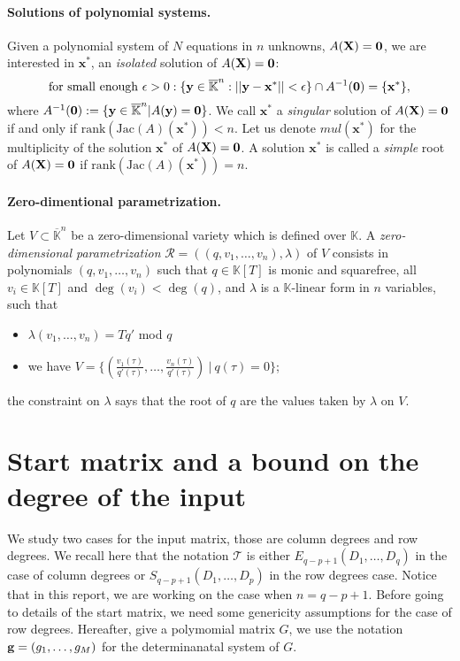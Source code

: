\documentclass[11pt]{article}
\numberwithin{Property}{section}
\numberwithin{Theorem}{section}
\numberwithin{Proposition}{section}
\numberwithin{Lemma}{section}
\numberwithin{Corollary}{section}
\numberwithin{Definition}{section}
\numberwithin{Remark}{section}
\numberwithin{Conjecture}{section}
\numberwithin{Problem}{section}
\numberwithin{Claim}{section}
\theoremstyle{definition}
\numberwithin{Example}{section}
\def\bar{\overline}
\newcommand{\field}{\mathbb{K}} %
\newcommand{\mat}[1]{\mathbf{\MakeUppercase{#1}}} %
\begin{document}
\paragraph{Solutions of polynomial systems.} Given a polynomial system of $N$ equations in $n$ unknowns, $A(\mat{X}) = \mat{0}$, we are interested in $\mathbf{x}^*$, an \emph{isolated} solution of $A(\mat{X}) = \mat{0}$:
\[
\mathrm{for \ small \ enough} \ \epsilon > 0 : \{\mathbf{y} \in \bar{\field}^n : ||\mathbf{y} - \mathbf{x}^*|| < \epsilon\} \cap A^{-1}(\mat{0}) = \{\mathbf{x}^*\}, 
\] where $A^{-1}(\mat{0}) := \{\mathbf{y} \in \bar{\field}^n | A(\mathbf{y}) = \mat{0}\}$. We call $\mathbf{x}^*$ a \emph{singular} solution of $A(\mat{X}) = \mat{0}$ if and only if $\mathrm{rank}(\mathrm{Jac}(A)(\mathbf{x}^*)) < n$.  Let us denote $mul(\mathbf{x}^*)$ for the multiplicity of the solution $\mathbf{x}^*$ of $A(\mat{X}) = \mat{0}$.   A solution $\mathbf{x}^*$ is called a \emph{simple} root of $A(\mat{X}) = \mat{0}$ if  $\mathrm{rank}(\mathrm{Jac}(A)(\mathbf{x}^*)) = n$.
\paragraph{Zero-dimentional parametrization.} Let $V \subset \bar{\field}^n$ be a zero-dimensional variety which is defined over $\field$. A \emph{zero-dimensional parametrization} $\mathscr{R} = ((q,v_1, \ldots, v_n), \lambda)$ of $V$ consists in polynomials $(q,v_1, \ldots, v_n)$ such that $q \in \field[T]$ is monic and squarefree, all $v_i \in \field[T]$ and $\deg(v_i) < \deg(q)$, and $\lambda$ is a $\field$-linear form in $n$ variables, such that 
\begin{itemize}
\item $\lambda(v_1, \ldots, v_n) = Tq'$ mod $q$
\item we have $V = \{(\frac{v_1(\tau)}{q'(\tau)}, \ldots, \frac{v_n(\tau)}{q'(\tau)}) \ | \ q(\tau) = 0\}$;
\end{itemize}
the constraint on $\lambda$ says that the root of $q$ are the values taken by $\lambda$ on $V$. 

\section{Start matrix and a bound on the degree of the input}
We study two cases for the input matrix, those are column degrees and row degrees. We recall here that the notation $\mathcal{T}$ is either $E_{q-p+1}(D_1, \ldots, D_q)$ in the case of column degrees or $S_{q-p+1}(D_1, \ldots, D_p)$ in the row degrees case. Notice that in this report, we are working on the case when $n = q-p+1$. Before going to details of the start matrix, we need some genericity assumptions for the case of row degrees. Hereafter, give a polymomial matrix $G$, we use the notation ${\bf g} = (g_1, \ldots, g_M)$ for the determinanatal system of $G$. 
\end{document}
